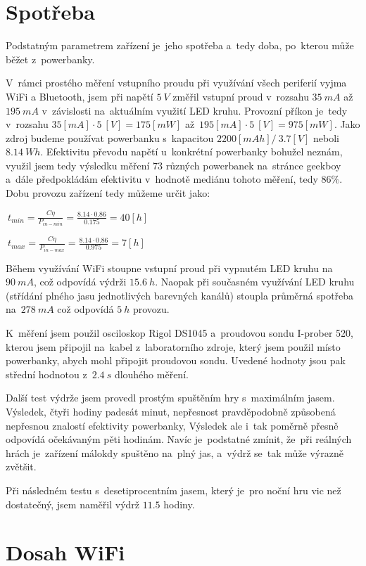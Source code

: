 \section{Spotřeba}
Podstatným parametrem zařízení je~jeho spotřeba a~tedy doba, po~kterou může běžet z~powerbanky.

V~rámci prostého měření vstupního proudu při využívání všech periferií vyjma WiFi a Bluetooth, jsem při napětí \(5~V\) změřil vstupní proud v~rozsahu \(35~mA\) až~\(195~mA\) v~závislosti na~aktuálním využití LED kruhu.
Provozní příkon je~tedy v~rozsahu \(35 [mA] \cdot 5~[V] = 175 [mW]\) až~\(195 [mA] \cdot 5~[V] = 975 [mW]\).
Jako zdroj budeme používat powerbanku s~kapacitou \(2200 [mAh] /~3.7 [V]\) neboli \(8.14~Wh\).
Efektivitu převodu napětí u~konkrétní powerbanky bohužel neznám, využil jsem tedy výsledku měření \(73\) různých powerbanek na~stránce geekboy \cite{TestPowerbank} a~dále předpokládám efektivitu v~hodnotě mediánu tohoto měření, tedy \(86\%\).
Dobu provozu zařízení tedy můžeme určit jako: 

\large
\(
 ~t_{min} = \frac{C \eta}{P_{in-min}} = \frac{8.14 \cdot 0.86}{0.175} = 40 [h]
\)

\(
 ~t_{max} = \frac{C \eta}{P_{in-max}} = \frac{8.14 \cdot 0.86}{0.975} = 7 [h]
\)
\normalsize

Během využívání WiFi stoupne vstupní proud při vypnutém LED kruhu na~\(90~mA\), což odpovídá výdrži \(15.6~h\).
Naopak při současném využívání LED kruhu (střídání plného jasu jednotlivých barevných kanálů) stoupla průměrná spotřeba na~\(278~mA\) což odpovídá \(5~h\) provozu.

K~měření jsem použil osciloskop Rigol DS1045 a~proudovou sondu I-prober 520, kterou jsem připojil na~kabel z~laboratorního zdroje, který jsem použil místo powerbanky, abych mohl připojit proudovou sondu.
Uvedené hodnoty jsou pak střední hodnotou z~\(2.4~s\) dlouhého měření.

Další test výdrže jsem provedl prostým spuštěním hry s~maximálním jasem.
Výsledek, čtyři hodiny padesát minut, nepřesnost pravděpodobně způsobená nepřesnou znalostí efektivity powerbanky, 
Výsledek ale i~tak poměrně přesně odpovídá očekávaným pěti hodinám.
Navíc je~podstatné zmínit, že~při reálných hrách je~zařízení málokdy spuštěno na~plný jas, a~výdrž se~tak může výrazně zvětšit.

Při následném testu s~desetiprocentním jasem, který je~pro noční hru vic než dostatečný, jsem naměřil výdrž \(11.5\) hodiny.

\section{Dosah WiFi}

